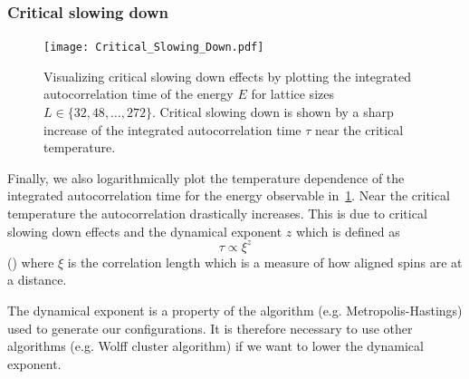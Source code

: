 \subsubsection{Critical slowing down}
\begin{figure}
	\centering
	\texttt{[image: Critical\_Slowing\_Down.pdf]}
	\caption[Critical slowing down effect for different lattice sizes]{Visualizing critical slowing down effects by plotting the integrated autocorrelation time of the energy $E$ for lattice sizes $L\in\{32, 48, \dots, 272\}$. Critical slowing down is shown by a sharp increase of the integrated autocorrelation time $\tau$ near the critical temperature.}
	\label{fig:critical_slowing_down}
\end{figure}
Finally, we also logarithmically plot the temperature dependence of the integrated autocorrelation time for the energy observable in~\cref{fig:critical_slowing_down}. Near the critical temperature the autocorrelation drastically increases. This is due to critical slowing down effects and the dynamical exponent $z$ which is defined as
\begin{equation}
	\tau \propto \xi^z
\end{equation}
(\citet[eq. (6)]{bootstrap}) where $\xi$ is the correlation length which is a measure of how aligned spins are at a distance.

The dynamical exponent is a property of the algorithm (e.g. Metropolis-Hastings) used to generate our configurations. It is therefore necessary to use other algorithms (e.g. Wolff cluster algorithm) if we want to lower the dynamical exponent.
